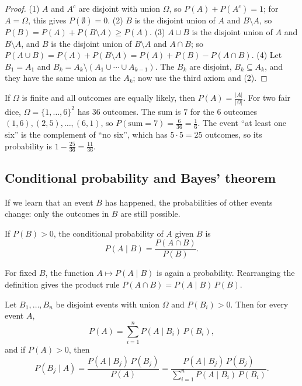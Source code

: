 \begin{proof}
    (1) $A$ and $A^c$ are disjoint with union $\Omega$, so $P(A) + P(A^c) = 1$; for $A = \Omega$, this gives $P(\emptyset) = 0$. (2) $B$ is the disjoint union of $A$ and $B \setminus A$, so $P(B) = P(A) + P(B \setminus A) \geq P(A)$. (3) $A \cup B$ is the disjoint union of $A$ and $B \setminus A$, and $B$ is the disjoint union of $B \setminus A$ and $A \cap B$; so $P(A \cup B) = P(A) + P(B \setminus A) = P(A) + P(B) - P(A \cap B)$. (4) Let $B_1 = A_1$ and $B_k = A_k \setminus (A_1 \cup \cdots \cup A_{k-1})$. The $B_k$ are disjoint, $B_k \subseteq A_k$, and they have the same union as the $A_k$; now use the third axiom and (2).
\end{proof}

\begin{example}\label{L4-ex:dice}
    If $\Omega$ is finite and all outcomes are equally likely, then $P(A) = \frac{|A|}{|\Omega|}$. For two fair dice, $\Omega = \{1, \ldots, 6\}^2$ has $36$ outcomes. The sum is $7$ for the $6$ outcomes $(1, 6), (2, 5), \ldots, (6, 1)$, so $P(\text{sum} = 7) = \frac{6}{36} = \frac{1}{6}$. The event ``at least one six'' is the complement of ``no six'', which has $5 \cdot 5 = 25$ outcomes, so its probability is $1 - \frac{25}{36} = \frac{11}{36}$.
\end{example}

\subsection{Conditional probability and Bayes' theorem}

If we learn that an event $B$ has happened, the probabilities of other events change: only the outcomes in $B$ are still possible.

\begin{definition}\label{L4-def:conditional}
    If $P(B) > 0$, the conditional probability of $A$ given $B$ is
    \[P(A \mid B) = \frac{P(A \cap B)}{P(B)}.\]
\end{definition}

For fixed $B$, the function $A \mapsto P(A \mid B)$ is again a probability. Rearranging the definition gives the product rule $P(A \cap B) = P(A \mid B)\,P(B)$.

\begin{theorem}\label{L4-thm:bayes}
    Let $B_1, \ldots, B_n$ be disjoint events with union $\Omega$ and $P(B_i) > 0$. Then for every event $A$,
    \[P(A) = \sum_{i=1}^n P(A \mid B_i)\,P(B_i),\]
    and if $P(A) > 0$, then
    \[P(B_j \mid A) = \frac{P(A \mid B_j)\,P(B_j)}{P(A)} = \frac{P(A \mid B_j)\,P(B_j)}{\sum_{i=1}^n P(A \mid B_i)\,P(B_i)}.\]
\end{theorem}

